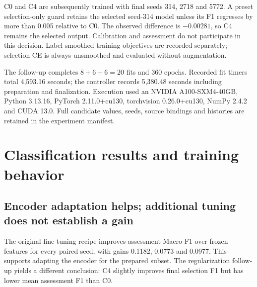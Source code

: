 C0 and C4 are subsequently trained with final seeds 314, 2718 and 5772. A preset selection-only guard retains the selected seed-314 model unless its F1 regresses by more than 0.005 relative to C0. The observed difference is $-0.00281$, so C4 remains the selected output. Calibration and assessment do not participate in this decision. Label-smoothed training objectives are recorded separately; selection CE is always unsmoothed and evaluated without augmentation.

The follow-up completes $8+6+6=20$ fits and 360 epochs. Recorded fit timers total 4,593.16 seconds; the controller records 5,380.48 seconds including preparation and finalization. Execution used an NVIDIA A100-SXM4-40GB, Python 3.13.16, PyTorch 2.11.0+cu130, torchvision 0.26.0+cu130, NumPy 2.4.2 and CUDA 13.0. Full candidate values, seeds, source bindings and histories are retained in the experiment manifest.

\clearpage
\section{Classification results and training behavior}
\subsection{Encoder adaptation helps; additional tuning does not establish a gain}
The original fine-tuning recipe improves assessment Macro-F1 over frozen features for every paired seed, with gains 0.1182, 0.0773 and 0.0977. This supports adapting the encoder for the prepared subset. The regularization follow-up yields a different conclusion: C4 slightly improves final selection F1 but has lower mean assessment F1 than C0.

